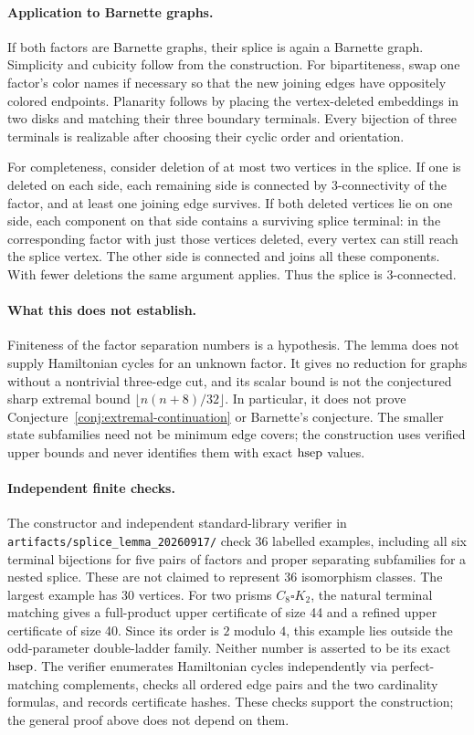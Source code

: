 \paragraph{Application to Barnette graphs.}
If both factors are Barnette graphs, their splice is again a Barnette graph.
Simplicity and cubicity follow from the construction. For bipartiteness, swap
one factor's color names if necessary so that the new joining edges have
oppositely colored endpoints. Planarity follows by placing the vertex-deleted
embeddings in two disks and matching their three boundary terminals. Every
bijection of three terminals is realizable after choosing their cyclic order
and orientation.

For completeness, consider deletion of at most two vertices in the splice.
If one is deleted on each side, each remaining side is connected by
3-connectivity of the factor, and at least one joining edge survives.
If both deleted vertices lie on one side, each component on that side contains
a surviving splice terminal: in the corresponding factor with just those
vertices deleted, every vertex can still reach the splice vertex.
The other side is connected and joins all these components. With fewer
deletions the same argument applies. Thus the splice is 3-connected.

\paragraph{What this does not establish.}
Finiteness of the factor separation numbers is a hypothesis. The lemma does
not supply Hamiltonian cycles for an unknown factor. It gives no reduction
for graphs without a nontrivial three-edge cut, and its scalar bound is not
the conjectured sharp extremal bound $\lfloor n(n+8)/32\rfloor$.
In particular, it does not prove Conjecture~\ref{conj:extremal-continuation}
or Barnette's conjecture.
The smaller state subfamilies need not be minimum edge covers; the construction
uses verified upper bounds and never identifies them with exact $\operatorname{hsep}$ values.


\paragraph{Independent finite checks.}
The constructor and independent standard-library verifier in
\texttt{artifacts/splice\_lemma\_20260917/} check 36 labelled examples, including
all six terminal bijections for five pairs of factors and proper separating
subfamilies for a nested splice. These are not claimed to represent 36
isomorphism classes. The largest example has 30 vertices. For two prisms
$C_8\square K_2$, the natural terminal matching gives a full-product upper
certificate of size 44 and a refined upper certificate of size 40.
Since its order is $2$ modulo $4$, this example lies outside the odd-parameter
double-ladder family. Neither number is asserted to be its exact $\operatorname{hsep}$.
The verifier enumerates Hamiltonian cycles independently via perfect-matching
complements, checks all ordered edge pairs and the two cardinality formulas,
and records certificate hashes. These checks support the construction;
the general proof above does not depend on them.
